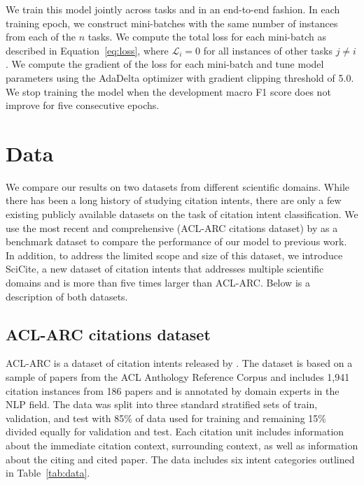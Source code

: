 \documentclass[11pt,a4paper]{article}
\newcommand{\acldata}{ACL-ARC\xspace}
\newcommand{\ourdata}{SciCite\xspace}
\newcommand{\calL}{\mathcal{L}}
\begin{document}
We train this model jointly across tasks and in an end-to-end fashion.
In each training epoch, we construct mini-batches with the same number of instances from each of the $n$ tasks. We compute the total loss for each mini-batch as described in Equation~\ref{eq:loss}, where $\calL_i{=}0$ for all instances of other tasks $j{\neq}i$.
We compute the gradient of the loss for each mini-batch and tune model parameters using the AdaDelta optimizer \cite{zeiler2012adadelta} with gradient clipping threshold of 5.0.
We stop training the model when the development macro F1 score does not improve for five consecutive epochs.



\section{Data}
\label{sec:data}


We compare our results on two datasets from different scientific domains. While there has been a long history of studying citation intents, there are only a few existing publicly available datasets on the task of citation intent classification. We use the most recent and comprehensive (\acldata citations dataset) by \citet{jurgens2018} as a benchmark dataset to compare the performance of our model to previous work. In addition, to address the limited scope and size of this dataset, we introduce \ourdata, a new dataset of citation intents that addresses multiple scientific domains and is more than five times larger than \acldata.
Below is a description of both datasets.



\subsection{ACL-ARC citations dataset}
\acldata is a dataset of citation intents released by \citet{jurgens2018}. The dataset is based on a sample of papers from the ACL Anthology Reference Corpus \cite{Bird2008TheAA} and includes 1,941 citation instances from 186 papers and is annotated by domain experts in the NLP field. The data was split into three standard stratified sets of train, validation, and test with 85\% of data used for training and remaining 15\% divided equally for validation and test. Each citation unit includes information about the immediate citation context, surrounding context, as well as information about the citing and cited paper. The data includes six intent categories outlined in Table~\ref{tab:data}.
\end{document}
